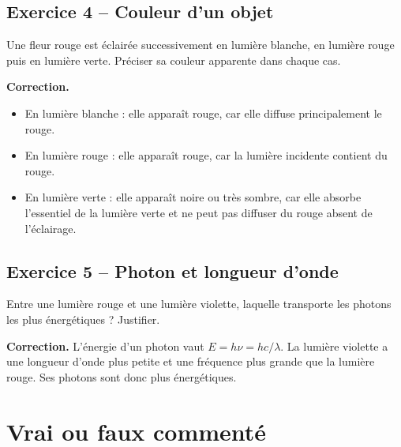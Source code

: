 \documentclass[11pt,a4paper]{article}
\begin{document}
\subsection*{Exercice 4 -- Couleur d'un objet}
Une fleur rouge est éclairée successivement en lumière blanche, en lumière rouge puis en lumière verte. Préciser sa couleur apparente dans chaque cas.

\textbf{Correction.}
\begin{itemize}
    \item En lumière blanche : elle apparaît rouge, car elle diffuse principalement le rouge.
    \item En lumière rouge : elle apparaît rouge, car la lumière incidente contient du rouge.
    \item En lumière verte : elle apparaît noire ou très sombre, car elle absorbe l'essentiel de la lumière verte et ne peut pas diffuser du rouge absent de l'éclairage.
\end{itemize}

\subsection*{Exercice 5 -- Photon et longueur d'onde}
Entre une lumière rouge et une lumière violette, laquelle transporte les photons les plus énergétiques ? Justifier.

\textbf{Correction.}
L'énergie d'un photon vaut $E=h\nu=hc/\lambda$. La lumière violette a une longueur d'onde plus petite et une fréquence plus grande que la lumière rouge. Ses photons sont donc plus énergétiques.

\section{Vrai ou faux commenté}
\end{document}
